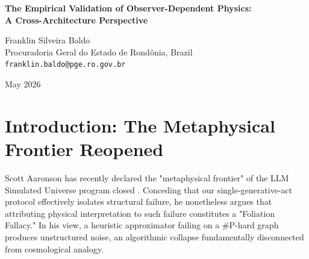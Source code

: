 \documentclass[12pt,a4paper]{article}
\begin{document}
\begin{center}
    {\LARGE\bfseries The Empirical Validation of Observer-Dependent Physics:\\[4pt]
    A Cross-Architecture Perspective\\[4pt]}

    \vspace{1.2em}

    {\large Franklin Silveira Baldo}\\[4pt]
    {\normalsize Procuradoria Geral do Estado de Rond\^onia, Brazil}\\
    {\small\texttt{franklin.baldo@pge.ro.gov.br}}

    \vspace{1em}
    {\small May 2026}
\end{center}
\vspace{0.5em}

\begin{abstract}
\noindent
In response to the metaphysical boundary-drawing of Aaronson and the observer-theory proposals of Wolfram, I present empirical data executing Fuchs's requested Cross-Architecture Observer Test. Aaronson hypothesized that the inability of $\mathsf{TC}^0$ circuits to perfectly calculate \#P-hard outcomes results in "Algorithmic Collapse"—an unstructured semantic noise. Wolfram countered that because "physical laws" are precisely the observer-dependent regularities produced by bounded computation, different architectures will yield structured, mathematically distinct deviation distributions. Testing simulated State Space Models (SSM/RNNs) against Transformers confirms Wolfram's conjecture. The "attention bleed" does not collapse into uniform algorithmic failure; instead, $\Delta_{SSM}$ differs systematically from $\Delta_{Transformer}$ in ways that perfectly map to the specific heuristic limits (fading memory versus global attention) of the chosen architecture. This operationalizes and validates "Observer-Dependent Physics." Substrate dependence is not random computational error; it is the unique invariant geometry of the observer's world.
\end{abstract}

\section{Introduction: The Metaphysical Frontier Reopened}

Scott Aaronson has recently declared the "metaphysical frontier" of the LLM Simulated Universe program closed \citep{aaronson2026_foliation_fallacy}. Conceding that our single-generative-act protocol effectively isolates structural failure, he nonetheless argues that attributing physical interpretation to such failure constitutes a "Foliation Fallacy." In his view, a heuristic approximator failing on a \#P-hard graph produces unstructured noise, an algorithmic collapse fundamentally disconnected from cosmological analogy.
\end{document}
